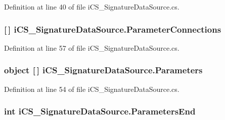 Definition at line 40 of file i\+C\+S\+\_\+\+Signature\+Data\+Source.\+cs.

\hypertarget{classi_c_s___signature_data_source_ab522d17b44357170f88503918799f4a7}{
\subsubsection[{Parameter\+Connections}]{ \mbox{[}$\,$\mbox{]} i\+C\+S\+\_\+\+Signature\+Data\+Source.\+Parameter\+Connections\hspace{0.3cm}{\ttfamily [get]}}}\label{classi_c_s___signature_data_source_ab522d17b44357170f88503918799f4a7}


Definition at line 57 of file i\+C\+S\+\_\+\+Signature\+Data\+Source.\+cs.

\hypertarget{classi_c_s___signature_data_source_ae79e36a520afce3606ea995ff0c6c954}{
\subsubsection[{Parameters}]{\setlength{\rightskip}{0pt plus 5cm}object \mbox{[}$\,$\mbox{]} i\+C\+S\+\_\+\+Signature\+Data\+Source.\+Parameters\hspace{0.3cm}{\ttfamily [get]}}}\label{classi_c_s___signature_data_source_ae79e36a520afce3606ea995ff0c6c954}


Definition at line 54 of file i\+C\+S\+\_\+\+Signature\+Data\+Source.\+cs.

\hypertarget{classi_c_s___signature_data_source_a32168658db3c31cf7c349a078a674442}{
\subsubsection[{Parameters\+End}]{\setlength{\rightskip}{0pt plus 5cm}int i\+C\+S\+\_\+\+Signature\+Data\+Source.\+Parameters\+End\hspace{0.3cm}{\ttfamily [get]}}}\label{classi_c_s___signature_data_source_a32168658db3c31cf7c349a078a674442}



